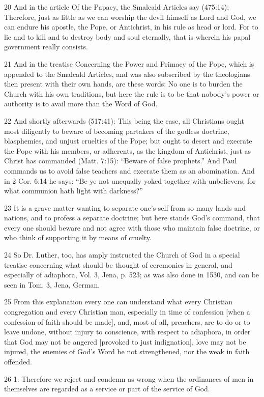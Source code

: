 {20 And in the article Of the Papacy, the Smalcald Articles say (475:14): Therefore, just as little as we can worship the devil himself as Lord and God, we can endure his apostle, the Pope, or Antichrist, in his rule as head or lord. For to lie and to kill and to destroy body and soul eternally, that is wherein his papal government really consists.

21 And in the treatise Concerning the Power and Primacy of the Pope, which is appended to the Smalcald Articles, and was also subscribed by the theologians then present with their own hands, are these words: No one is to burden the Church with his own traditions, but here the rule is to be that nobody’s power or authority is to avail more than the Word of God.

22 And shortly afterwards (517:41): This being the case, all Christians ought most diligently to beware of becoming partakers of the godless doctrine, blasphemies, and unjust cruelties of the Pope; but ought to desert and execrate the Pope with his members, or adherents, as the kingdom of Antichrist, just as Christ has commanded (Matt. 7:15): “Beware of false prophets.” And Paul commands us to avoid false teachers and execrate them as an abomination. And in 2 Cor. 6:14 he says: “Be ye not unequally yoked together with unbelievers; for what communion hath light with darkness?”

23 It is a grave matter wanting to separate one’s self from so many lands and nations, and to profess a separate doctrine; but here stands God’s command, that every one should beware and not agree with those who maintain false doctrine, or who think of supporting it by means of cruelty.

24 So Dr. Luther, too, has amply instructed the Church of God in a special treatise concerning what should be thought of ceremonies in general, and especially of adiaphora, Vol. 3, Jena, p. 523; as was also done in 1530, and can be seen in Tom. 3, Jena, German.

25 From this explanation every one can understand what every Christian congregation and every Christian man, especially in time of confession [when a confession of faith should be made], and, most of all, preachers, are to do or to leave undone, without injury to conscience, with respect to adiaphora, in order that God may not be angered [provoked to just indignation], love may not be injured, the enemies of God’s Word be not strengthened, nor the weak in faith offended.

26 1. Therefore we reject and condemn as wrong when the ordinances of men in themselves are regarded as a service or part of the service of God.

}
